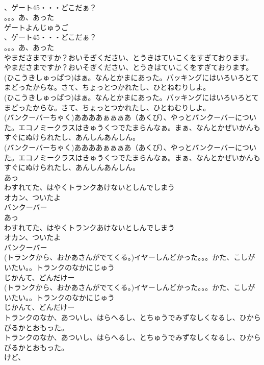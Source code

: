 \documentclass[8pt]{extreport}
\begin{document}
\begin{CJK}{UTF8}{min}
\\	、ゲート45・・・どこだぁ？
\\	。。。あ、あった
\\	ゲートよんじゅうご
\\	、ゲート45・・・どこだぁ？
\\	。。。あ、あった
\\	やまださまですか？おいそぎください、とうきはていこくをすぎております。
\\	やまださまですか？おいそぎください、とうきはていこくをすぎております。
\\	(ひこうきしゅっぱつ)はぁ。なんとかまにあった。パッキングにはいろいろとてまどったからな。さて、ちょっとつかれたし、ひとねむりしよ。
\\	(ひこうきしゅっぱつ)はぁ。なんとかまにあった。パッキングにはいろいろとてまどったからな。さて、ちょっとつかれたし、ひとねむりしよ。
\\	(バンクーバーちゃく)ああああぁぁぁあ（あくび）、やっとバンクーバーについた。エコノミークラスはきゅうくつでたまらんなぁ。まぁ、なんとかぜいかんもすぐにぬけられたし、あんしんあんしん。
\\	(バンクーバーちゃく)ああああぁぁぁあ（あくび）、やっとバンクーバーについた。エコノミークラスはきゅうくつでたまらんなぁ。まぁ、なんとかぜいかんもすぐにぬけられたし、あんしんあんしん。
\\	あっ
\\	わすれてた、はやくトランクあけないとしんでしまう
\\	オカン、ついたよ
\\	バンクーバー
\\	あっ
\\	わすれてた、はやくトランクあけないとしんでしまう
\\	オカン、ついたよ
\\	バンクーバー
\\	(トランクから、おかあさんがでてくる。)イヤーしんどかった。。。かた、こしがいたい。。トランクのなかにじゅう
\\	じかんて、どんだけー
\\	(トランクから、おかあさんがでてくる。)イヤーしんどかった。。。かた、こしがいたい。。トランクのなかにじゅう
\\	じかんて、どんだけー
\\	トランクのなか、あついし、はらへるし、とちゅうでみずなしくなるし、ひからびるかとおもった。
\\	トランクのなか、あついし、はらへるし、とちゅうでみずなしくなるし、ひからびるかとおもった。
\\	けど、

\end{CJK}
\end{document}

